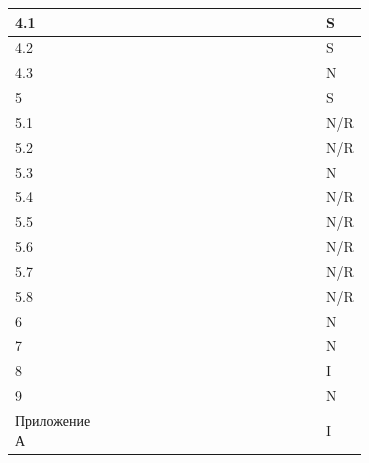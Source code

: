\begin{longtable}{|l|p{0.7\linewidth}|l|}
   \hline
   4.1 & & S \\
   \hline
   4.2 & & S \\
   \hline
   4.3 & & N \\
   \hline
   5 & & S \\
   \hline
   5.1 & & N/R \\
   \hline
   5.2 & & N/R \\
   \hline
   5.3 & & N \\
   \hline
   5.4 & & N/R \\
   \hline
   5.5 & & N/R \\
   \hline
   5.6 & & N/R \\
   \hline
   5.7 & & N/R \\
   \hline 
   5.8 & & N/R \\
   \hline
   6 & & N \\
   \hline
   7 & & N \\
   \hline
   8 & & I \\
   \hline
   9 & & N \\
   \hline
   Приложение А & & I \\
   \hline    
\end{longtable}
